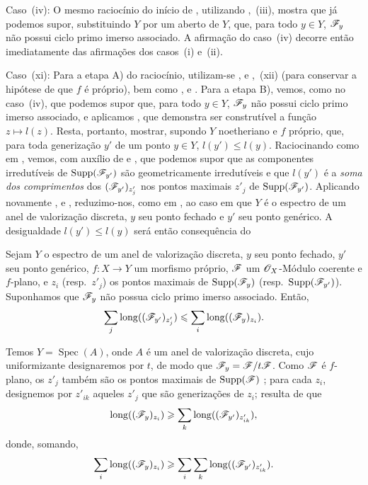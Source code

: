 \begin{env}[12.2.1.2]
\label{IV.12.2.1.2}
Caso~(iv): O mesmo raciocínio do
início de ,
utilizando ,~(iii),
mostra que já podemos supor,
substituindo $Y$ por um aberto de
$Y$, que, para todo $y\in Y$,
$\mathscr{F}_y$ não possui ciclo primo
imerso associado. A afirmação do
caso~(iv) decorre então
imediatamente das afirmações dos
casos~(i) e~(ii).
\end{env}

\begin{env}[12.2.1.3]
\label{IV.12.2.1.3}
Caso~(xi): Para a etapa A) do
raciocínio, utilizam-se
,
 e
,~(xii)
(para conservar a hipótese de
que $f$ é próprio), bem como
,
 e
. Para a etapa
B), vemos, como no caso~(iv),
que podemos supor que, para
todo $y\in Y$, $\mathscr{F}_y$ não
possui ciclo primo imerso
associado, e aplicamos
, que demonstra
ser construtível a função
$z\mapsto l(z)$. Resta,
portanto, mostrar, supondo
$Y$ noetheriano e $f$ próprio,
que, para toda generização
$y'$ de um ponto $y\in Y$,
$l(y')\leq l(y)$. Raciocinando
como em ,
vemos, com auxílio de
 e
, que podemos
supor que as componentes
irredutíveis de
$\operatorname{Supp}(\mathscr{F}_{y'})$
são geometricamente
irredutíveis e que $l(y')$
é a \emph{soma dos
comprimentos} dos
$(\mathscr{F}_{y'})_{z'_j}$ nos
pontos maximais $z'_j$ de
$\operatorname{Supp}(\mathscr{F}_{y'})$.
Aplicando novamente
,
 e
,
reduzimo-nos, como em
, ao caso
em que $Y$ é o espectro de um
anel de valorização discreta,
$y$ seu ponto fechado e $y'$
seu ponto genérico. A
desigualdade $l(y')\leq l(y)$
será então consequência do

\begin{lemma}[12.2.1.4]
\label{IV.12.2.1.4}
Sejam $Y$ o espectro de um anel
de valorização discreta, $y$
seu ponto fechado, $y'$ seu
ponto genérico, $f:X\to Y$
um morfismo próprio, $\mathscr{F}$
um $\mathscr{O}_X$-Módulo coerente e
$f$-plano, e $z_i$ (resp.\
$z'_j$) os pontos maximais de
$\operatorname{Supp}(\mathscr{F}_y)$
(resp.\
$\operatorname{Supp}(\mathscr{F}_{y'})$).
Suponhamos que $\mathscr{F}_y$ não
possua ciclo primo imerso
associado. Então,
\[
\sum_j\operatorname{long}
((\mathscr{F}_{y'})_{z'_j})
\leqslant
\sum_i\operatorname{long}
((\mathscr{F}_y)_{z_i}).
\]
\end{lemma}

Temos $Y=\operatorname{Spec}(A)$,
onde $A$ é um anel de
valorização discreta, cujo
uniformizante designaremos
por $t$, de modo que
$\mathscr{F}_y=\mathscr{F}/t\mathscr{F}$.
Como $\mathscr{F}$ é $f$-plano,
os $z'_j$ também são os
pontos maximais de
$\operatorname{Supp}(\mathscr{F})$
; para cada
$z_i$, designemos por
$z'_{ik}$ aqueles $z'_j$
que são generizações de
$z_i$; resulta de
 que
\[
\operatorname{long}
((\mathscr{F}_y)_{z_i})
\geqslant
\sum_k\operatorname{long}
((\mathscr{F}_{y'})_{z'_{ik}}),
\]
donde, somando,
\[
\sum_i\operatorname{long}
((\mathscr{F}_y)_{z_i})
\geqslant
\sum_i\sum_k
\operatorname{long}
((\mathscr{F}_{y'})_{z'_{ik}}).
\]


\end{env}

